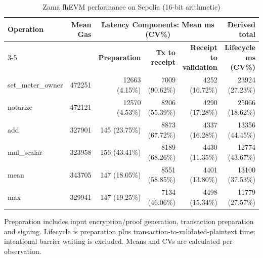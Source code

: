 \begin{table}[!t]
\caption{Zama fhEVM performance on Sepolia (16-bit arithmetic)}
\label{tab:zama-fhevm-sepolia-benchmark}
\centering
\scriptsize
\setlength{\tabcolsep}{4pt}
\begin{tabular}{|l|r|rrr|r|}
\hline
\textbf{Operation} &
\textbf{Mean Gas} &
\multicolumn{3}{c|}{\textbf{Latency Components: Mean ms (CV\%)}} &
\textbf{Derived total} \\
\cline{3-5}
& &
\textbf{Preparation} &
\textbf{Tx to receipt} &
\textbf{Receipt to validation} &
\textbf{Lifecycle ms (CV\%)} \\
\hline
set\_meter\_owner & 472251 & 12663 (4.15\%) & 7009 (90.62\%) & 4252 (16.72\%) & 23924 (27.23\%) \\
notarize & 472121 & 12570 (4.53\%) & 8206 (55.39\%) & 4290 (17.28\%) & 25066 (18.62\%) \\
add & 327901 & 145 (23.75\%) & 8873 (67.72\%) & 4337 (16.28\%) & 13356 (44.45\%) \\
mul\_scalar & 323958 & 156 (43.41\%) & 8189 (68.26\%) & 4430 (11.35\%) & 12774 (43.67\%) \\
mean & 343705 & 147 (18.05\%) & 8551 (58.85\%) & 4401 (13.80\%) & 13100 (37.53\%) \\
max & 329941 & 147 (19.25\%) & 7134 (46.06\%) & 4498 (15.34\%) & 11779 (27.57\%) \\
\hline
\end{tabular}
\vspace{2pt}
\parbox{\textwidth}{\scriptsize Preparation includes input encryption/proof generation, transaction preparation and signing. Lifecycle is preparation plus transaction-to-validated-plaintext time; intentional barrier waiting is excluded. Means and CVs are calculated per observation.}
\end{table}

